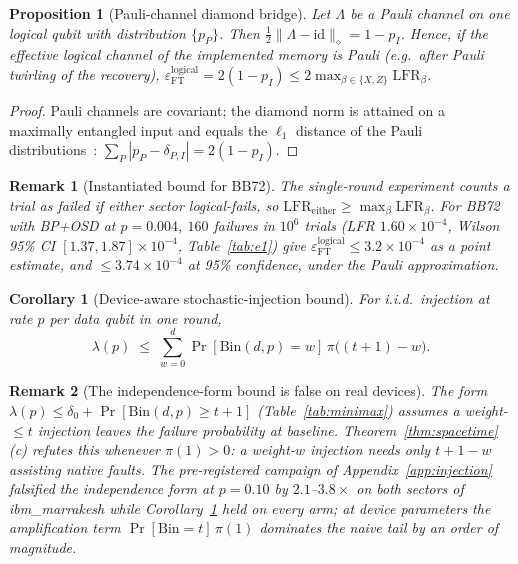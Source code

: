 \documentclass[11pt,a4paper]{article}
\newtheorem{corollary}{Corollary}\newtheorem{proposition}{Proposition}
\newtheorem{remark}{Remark}
\begin{document}
\begin{proposition}[Pauli-channel diamond bridge]\label{prop:bridge}
Let $\Lambda$ be a Pauli channel on one logical qubit with distribution
$\{p_P\}$. Then $\tfrac12\|\Lambda-\mathrm{id}\|_\diamond=1-p_I$.
Hence, if the effective logical channel of the implemented memory is
Pauli (e.g.\ after Pauli twirling of the recovery),
$\varepsilon_{\mathrm{FT}}^{\mathrm{logical}}=2(1-p_I)\le
2\max_{\beta\in\{X,Z\}}\mathrm{LFR}_\beta$.
\end{proposition}
\begin{proof}
Pauli channels are covariant; the diamond norm is attained on a
maximally entangled input and equals the $\ell_1$ distance of the Pauli
distributions~\cite{Watrous2018}: $\sum_P|p_P-\delta_{P,I}|=2(1-p_I)$.
\end{proof}
\begin{remark}[Instantiated bound for BB72]\label{rem:bridge-number}
The single-round experiment counts a trial as failed if either sector
logical-fails, so $\mathrm{LFR}_{\mathrm{either}}\ge
\max_{\beta}\mathrm{LFR}_{\beta}$. For BB72 with BP+OSD at $p=0.004$,
$160$ failures in $10^{6}$ trials (LFR $1.60\times10^{-4}$, Wilson 95\%
CI $[1.37,1.87]\times10^{-4}$, Table~\ref{tab:e1}) give
$\varepsilon_{\mathrm{FT}}^{\mathrm{logical}}\le3.2\times10^{-4}$ as a
point estimate, and $\le3.74\times10^{-4}$ at 95\% confidence, under
the Pauli approximation.
\end{remark}

\begin{corollary}[Device-aware stochastic-injection bound]\label{cor:stoch}
For i.i.d.\ injection at rate $p$ per data qubit in one round,
\[
\lambda(p)\;\le\;\sum_{w=0}^{d}\Pr[\mathrm{Bin}(d,p)=w]\,
\pi\bigl((t{+}1)-w\bigr).
\]
\end{corollary}

\begin{remark}[The independence-form bound is false on real devices]
\label{rem:naive-false}
The form $\lambda(p)\le\delta_0+\Pr[\mathrm{Bin}(d,p)\ge t{+}1]$
(Table~\ref{tab:minimax}) assumes a weight-$\le t$ injection leaves the
failure probability at baseline. Theorem~\ref{thm:spacetime}(c) refutes
this whenever $\pi(1)>0$: a weight-$w$ injection needs only
$t{+}1{-}w$ assisting native faults. The pre-registered campaign of
Appendix~\ref{app:injection} falsified the independence form at
$p=0.10$ by $2.1$--$3.8\times$ on both sectors of ibm\_marrakesh while
Corollary~\ref{cor:stoch} held on every arm; at device parameters the
amplification term $\Pr[\mathrm{Bin}=t]\,\pi(1)$ dominates the naive
tail by an order of magnitude.
\end{remark}
\end{document}
